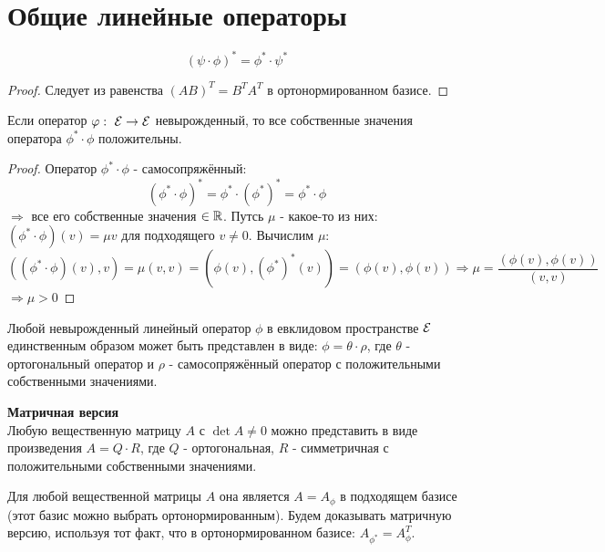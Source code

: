 \section{Общие линейные операторы}
\begin{subtheorem}
    $$(\psi \cdot \phi)^* = \phi^* \cdot \psi^*$$ 
\end{subtheorem} 
\begin{proof}
    Следует из равенства $(AB)^T = B^TA^T$ в ортонормированном базисе.
\end{proof}
\begin{lemma}
    Если оператор $\varphi: \ \mathcal{E} \to \mathcal{E}$ невырожденный, то все собственные значения оператора $\phi^* \cdot \phi$ положительны.  
\end{lemma} 
\begin{proof}
    Оператор $\phi^* \cdot \phi$ - самосопряжённый: 
    $$(\phi^* \cdot \phi)^* = \phi^* \cdot (\phi^*)^* = \phi^* \cdot \phi$$
    $\Longrightarrow $ все его собственные значения $\in \mathbb{R}$. Путсь $\mu$ - какое-то из них: $(\phi^* \cdot \phi)(v) = \mu v$ для подходящего $v \neq 0$. Вычислим $\mu$: 
    $$((\phi^* \cdot \phi)(v),v) = \mu(v,v) = (\phi(v),(\phi^*)^*(v)) = (\phi(v), \phi(v)) \Longrightarrow \mu = \frac{(\phi(v),\phi(v))}{(v,v)}$$
    $\Longrightarrow \mu>0$     
\end{proof}
\begin{theorem}
    Любой невырожденный линейный оператор $\phi$ в евклидовом пространстве $\mathcal{E}$ единственным образом может быть представлен в виде: $\phi = \theta \cdot \rho$, где $\theta$ - ортогональный оператор и $\rho$ - самосопряжённый оператор с положительными собственными значениями. 
\end{theorem}
\begin{theorem} \textbf{Матричная версия}\\
    Любую вещественную матрицу $A$ с $\det A \neq 0$ можно представить в виде произведения $A = Q \cdot R$, где $Q$ - ортогональная, $R$ - симметричная с положительными собственными значениями.      
\end{theorem} 
\begin{remark}
    Для любой вещественной матрицы $A$ она является $A = A_\phi$ в подходящем базисе (этот базис можно выбрать ортонормированным). Будем доказывать матричную версию, используя тот факт, что в ортонормированном базисе: $A_{\phi^*} = A_\phi^T$.
\end{remark}
